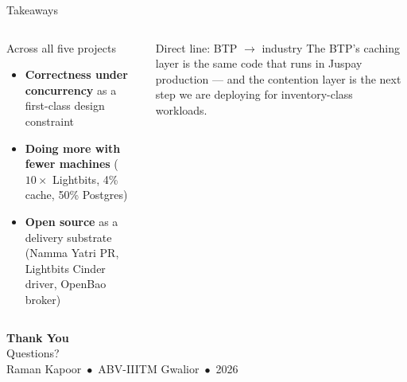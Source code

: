 \documentclass[aspectratio=169,xcolor=dvipsnames,9pt]{beamer}
\begin{document}
\begin{frame}{Takeaways}
\begin{columns}[T]
  \begin{block}{Across all five projects}
    \footnotesize
    \begin{itemize}
      \item \textbf{Correctness under concurrency} as a first-class design constraint
      \item \textbf{Doing more with fewer machines} ($10\times$ Lightbits, 4\% cache, 50\% Postgres)
      \item \textbf{Open source} as a delivery substrate (Namma Yatri PR, Lightbits Cinder driver, OpenBao broker)
    \end{itemize}
  \end{block}
  \begin{exampleblock}{Direct line: BTP $\to$ industry}
    \footnotesize
    The BTP's caching layer is the same code that runs in Juspay production --- and the contention layer is the next step we are deploying for inventory-class workloads.
  \end{exampleblock}
\end{columns}

\vspace{1em}
\centering
{\Huge\bfseries Thank You}\\[0.5em]
{\Large Questions?}\\[1em]
{\small Raman Kapoor \,$\bullet$\, ABV-IIITM Gwalior \,$\bullet$\, 2026}
\end{frame}
\end{document}
